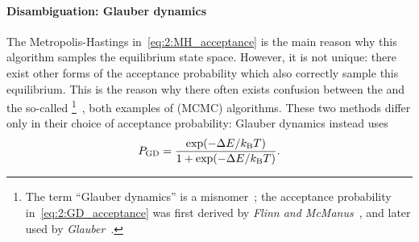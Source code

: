\paragraph{Disambiguation: Glauber dynamics}
The Metropolis-Hastings  in~\cref{eq:2:MH_acceptance} is the main reason why this algorithm samples the equilibrium state space.
However, it is not unique: there exist other forms of the acceptance probability which also correctly sample this equilibrium.
This is the reason why there often exists confusion between the  and the so-called \footnote{
	The term ``Glauber dynamics'' is a misnomer~\cite{bit-player_MCvsGlauber}; the acceptance probability in~\cref{eq:2:GD_acceptance} was first derived by \textit{Flinn and McManus}~\cite{flinn1961TransitionProbability}, and later used by \textit{Glauber}~\cite{glauber1963time}.
}~\cite{flinn1961TransitionProbability,glauber1963time}, both examples of  (MCMC) algorithms.
These two methods differ only in their choice of acceptance probability: Glauber dynamics instead uses
\begin{equation}
	\label{eq:2:GD_acceptance}
	P_\mathrm{GD} = \frac{\exp(-\Delta E / \kBT)}{1 + \exp(-\Delta E / \kBT)} \mathrm{.}
\end{equation}


